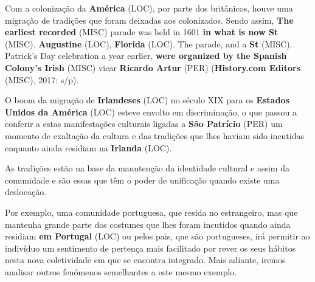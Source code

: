 \documentclass[12pt,a4paper]{article}
\begin{document}
Com  a  colonização  da  \textbf{América} (LOC),  por  parte  dos  britânicos,  houve  uma  migração  de tradições que foram deixadas aos colonizados. Sendo assim, \textbf{The earliest recorded} (MISC) parade was held in 1601 \textbf{in what is now St} (MISC). \textbf{Augustine} (LOC), \textbf{Florida} (LOC). The parade, and a \textbf{St} (MISC). Patrick's Day celebration a year earlier, \textbf{were organized by the Spanish Colony's Irish} (MISC) vicar \textbf{Ricardo Artur} (PER) (\textbf{History.com Editors} (MISC), 2017: s/p).

O boom da  migração  de  \textbf{Irlandeses} (LOC)  no  século  XIX  para  os  \textbf{Estados  Unidos  da América} (LOC) esteve envolto em discriminação, o que passou a conferir a estas manifestações culturais ligadas a \textbf{São Patrício} (PER) um momento de exaltação da cultura e das tradições que lhes haviam sido incutidas enquanto ainda residiam na \textbf{Irlanda} (LOC).

As  tradições  estão  na  base  da  manutenção  da  identidade  cultural  e  assim  da comunidade e são essas que têm o poder de unificação quando existe uma deslocação.

Por exemplo, uma comunidade portuguesa, que resida no estrangeiro, mas que mantenha grande parte dos costumes que lhes foram incutidos quando ainda residiam \textbf{em Portugal} (LOC) ou pelos pais, que são portugueses, irá permitir ao indivíduo um sentimento de pertença mais  facilitado  por  rever  os  seus  hábitos  nesta  nova  coletividade  em  que  se  encontra integrado.  Mais  adiante,  iremos  analisar  outros  fenómenos  semelhantes  a  este  mesmo exemplo.
\end{document}
